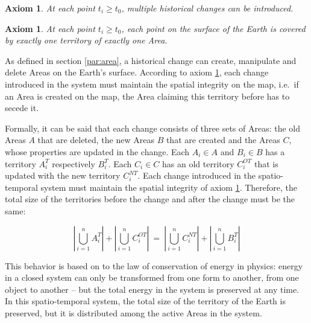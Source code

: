 \vspace{-2.0em}
\newtheorem{historical_change}[assicounter]{Axiom}
\begin{historical_change}
\label{axm:historical_change}
  At each point $t_i \geq t_0$, multiple historical changes can be introduced.
\end{historical_change}

\vspace{-2.0em}
\newtheorem{unique_coverage}[assicounter]{Axiom}
\begin{unique_coverage}
\label{axm:unique_coverage}
  At each point $t_i \geq t_0$, each point on the surface of the Earth is covered by exactly one territory of exactly one Area.
\end{unique_coverage}

As defined in section \ref{par:area}, a historical change can create, manipulate and delete Areas on the Earth's surface. According to axiom \ref{axm:unique_coverage}, each change introduced in the system must maintain the spatial integrity on the map, i.e.\ if an Area is created on the map, the Area claiming this territory before has to secede it.

Formally, it can be said that each change consists of three sets of Areas: the old Areas $A$ that are deleted, the new Areas $B$ that are created and the Areas $C$, whose properties are updated in the change. Each $A_i \in A$ and $B_i \in B$ has a territory $A_i^T$ respectively $B_i^T$. Each $C_i \in C$ has an old territory $C_i^{OT}$ that is updated with the new territory $C_i^{NT}$. Each change introduced in the spatio-temporal system must maintain the spatial integrity of axiom \ref{axm:unique_coverage}. Therefore, the total size of the territories before the change and after the change must be the same:

\vspace{-.5em}

\[
  \left|\bigcup\limits_{i=1}^n A_i^T\right|
  +
  \left|\bigcup\limits_{i=1}^n C_i^{OT}\right|
  ~=~
  \left|\bigcup\limits_{i=1}^n C_i^{NT}\right|
  +
  \left|\bigcup\limits_{i=1}^n B_i^T\right|
\]

\vspace{.5em}

This behavior is based on to the law of conservation of energy in physics: energy in a closed system can only be transformed from one form to another, from one object to another -- but the total energy in the system is preserved at any time. In this spatio-temporal system, the total size of the territory of the Earth is preserved, but it is distributed among the active Areas in the system.


